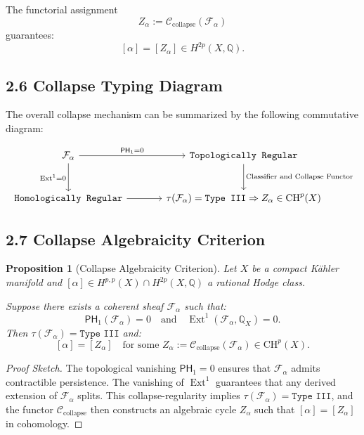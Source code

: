 \documentclass[11pt]{article}
\newtheorem{proposition}[theorem]{Proposition}
\DeclareMathOperator{\Ext}{Ext}
\begin{document}
The functorial assignment
\[
Z_\alpha := \mathcal{C}_{\text{collapse}}(\mathcal{F}_\alpha)
\]
guarantees:
\[
[\alpha] = [Z_\alpha] \in H^{2p}(X, \mathbb{Q}).
\]

\subsection{2.6 Collapse Typing Diagram}

The overall collapse mechanism can be summarized by the following commutative diagram:

\[
\begin{tikzcd}[row sep=large, column sep=large]
\mathcal{F}_\alpha \arrow[r, "\mathsf{PH}_1 = 0"] \arrow[d, swap, "\Ext^1 = 0"]
& \texttt{Topologically Regular} \arrow[d, "\text{Classifier and Collapse Functor}"] \\
\texttt{Homologically Regular} \arrow[r]
& \tau(\mathcal{F}_\alpha) = \texttt{Type III} \Rightarrow Z_\alpha \in \mathrm{CH}^p(X)
\end{tikzcd}
\]

\subsection{2.7 Collapse Algebraicity Criterion}

\begin{proposition}[Collapse Algebraicity Criterion]
Let $X$ be a compact Kähler manifold and $[\alpha] \in H^{p,p}(X) \cap H^{2p}(X, \mathbb{Q})$ a rational Hodge class.

Suppose there exists a coherent sheaf $\mathcal{F}_\alpha$ such that:
\[
\mathsf{PH}_1(\mathcal{F}_\alpha) = 0 \quad \text{and} \quad \Ext^1(\mathcal{F}_\alpha, \mathbb{Q}_X) = 0.
\]
Then $\tau(\mathcal{F}_\alpha) = \texttt{Type III}$ and:
\[
[\alpha] = [Z_\alpha] \quad \text{for some } Z_\alpha := \mathcal{C}_{\text{collapse}}(\mathcal{F}_\alpha) \in \mathrm{CH}^p(X).
\]
\end{proposition}

\begin{proof}[Proof Sketch]
The topological vanishing $\mathsf{PH}_1 = 0$ ensures that $\mathcal{F}_\alpha$ admits contractible persistence. The vanishing of $\Ext^1$ guarantees that any derived extension of $\mathcal{F}_\alpha$ splits. This collapse-regularity implies $\tau(\mathcal{F}_\alpha) = \texttt{Type III}$, and the functor $\mathcal{C}_{\text{collapse}}$ then constructs an algebraic cycle $Z_\alpha$ such that $[\alpha] = [Z_\alpha]$ in cohomology.
\end{proof}
\end{document}
